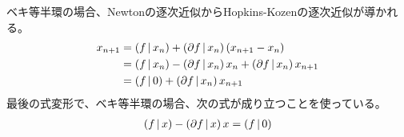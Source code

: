 {	ベキ等半環の場合、Newtonの逐次近似からHopkins-Kozenの逐次近似が導かれる。
	\begin{equation*}\begin{split}
			x_{n+1} 
			&= \mathinner{({f{\,|\,}x_n})} + \mathinner{({\partial f{\,|\,}x_n})}\mathinner{({x_{n+1} - x_n})} \\
			&= \mathinner{({f{\,|\,}x_n})} - \mathinner{({\partial f{\,|\,}x_n})}x_n
				+ \mathinner{({\partial f{\,|\,}x_n})}x_{n+1} \\
			&= \mathinner{({f{\,|\,}0})} + \mathinner{({\partial f{\,|\,}x_n})}x_{n+1} \\
	\end{split}\end{equation*}
	最後の式変形で、ベキ等半環の場合、次の式が成り立つことを使っている。
	\begin{equation*}\begin{split}
		\mathinner{({f{\,|\,}x})} - \mathinner{({\partial f{\,|\,}x})}x = \mathinner{({f{\,|\,}0})}
	\end{split}\end{equation*}

}
